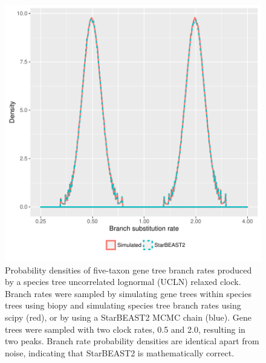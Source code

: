 \documentclass[12pt]{article}
\begin{document}
\begin{figure}[htb!]
\centering
\includegraphics[width=16cm]{gene_branch_rates.pdf}
\caption
{Probability densities of five-taxon gene tree branch rates produced by a
species tree uncorrelated lognormal (UCLN) relaxed clock. Branch rates were
sampled by simulating gene trees within species trees using biopy and simulating
species tree branch rates using scipy (red), or by using a StarBEAST2 MCMC chain
(blue). Gene trees were sampled with two clock rates, 0.5 and 2.0, resulting in
two peaks. Branch rate probability densities are identical apart from noise,
indicating that StarBEAST2 is mathematically correct.}
\label{fig:geneBranchRatesUCLD}
\end{figure}
\end{document}
